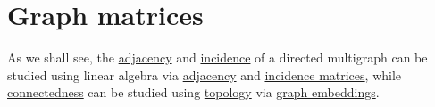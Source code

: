 \section{Graph matrices}\label{sec:graph_matrices}

\begin{remark}\label{rem:graphs_linear_algebra_and_topology}
  As we shall see, the \hyperref[def:graph_adjacency]{adjacency} and \hyperref[def:graph_incidence]{incidence} of a directed multigraph can be studied using linear algebra via \hyperref[def:graph_adjacency_matrix]{adjacency} and \hyperref[def:directed_incidence_matrix]{incidence matrices}, while \hyperref[def:graph_connectedness]{connectedness} can be studied using \hyperref[def:graph_connectedness]{topology} via \hyperref[def:graph_geometric_realization/embedding]{graph embeddings}.
\end{remark}

